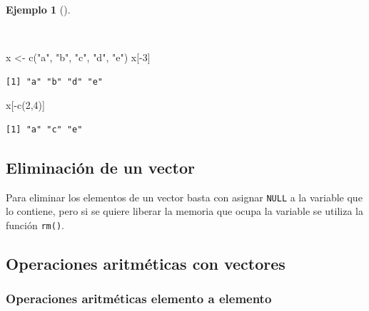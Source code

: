 \documentclass[
  a4paper,
]{scrreport}
\newenvironment{Shaded}{\begin{snugshade}}{\end{snugshade}}
\newcommand{\DecValTok}[1]{\textcolor[rgb]{0.68,0.00,0.00}{#1}}
\newcommand{\FunctionTok}[1]{\textcolor[rgb]{0.28,0.35,0.67}{#1}}
\newcommand{\NormalTok}[1]{\textcolor[rgb]{0.00,0.23,0.31}{#1}}
\newcommand{\OtherTok}[1]{\textcolor[rgb]{0.00,0.23,0.31}{#1}}
\newcommand{\SpecialCharTok}[1]{\textcolor[rgb]{0.37,0.37,0.37}{#1}}
\newcommand{\StringTok}[1]{\textcolor[rgb]{0.13,0.47,0.30}{#1}}
\theoremstyle{definition}
\theoremstyle{definition}
\newtheorem{example}{Ejemplo}[chapter]
\theoremstyle{remark}
\begin{document}
\begin{example}[]\protect\hypertarget{exm-eliminar-elementos-vector}{}\label{exm-eliminar-elementos-vector}

~

\begin{Shaded}
\begin{Highlighting}[]
\NormalTok{x }\OtherTok{\textless{}{-}} \FunctionTok{c}\NormalTok{(}\StringTok{"a"}\NormalTok{, }\StringTok{"b"}\NormalTok{, }\StringTok{"c"}\NormalTok{, }\StringTok{"d"}\NormalTok{, }\StringTok{"e"}\NormalTok{)}
\NormalTok{x[}\SpecialCharTok{{-}}\DecValTok{3}\NormalTok{]}
\end{Highlighting}
\end{Shaded}

\begin{verbatim}
[1] "a" "b" "d" "e"
\end{verbatim}

\begin{Shaded}
\begin{Highlighting}[]
\NormalTok{x[}\SpecialCharTok{{-}}\FunctionTok{c}\NormalTok{(}\DecValTok{2}\NormalTok{,}\DecValTok{4}\NormalTok{)]}
\end{Highlighting}
\end{Shaded}

\begin{verbatim}
[1] "a" "c" "e"
\end{verbatim}

\end{example}

\subsection{Eliminación de un vector}\label{eliminaciuxf3n-de-un-vector}

Para eliminar los elementos de un vector basta con asignar \texttt{NULL}
a la variable que lo contiene, pero si se quiere liberar la memoria que
ocupa la variable se utiliza la función \texttt{rm()}.

\subsection{Operaciones aritméticas con
vectores}\label{operaciones-aritmuxe9ticas-con-vectores}

\subsubsection{Operaciones aritméticas elemento a
elemento}\label{operaciones-aritmuxe9ticas-elemento-a-elemento}
\end{document}
